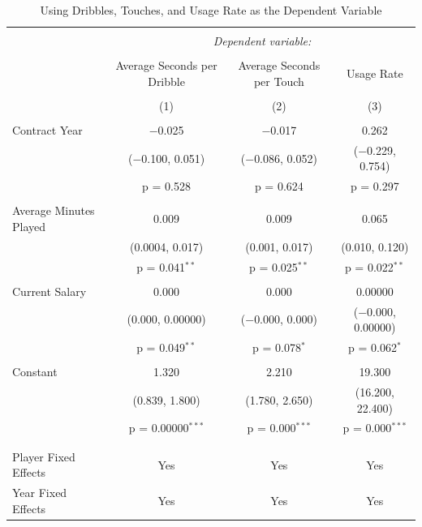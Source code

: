 \documentclass[12pt]{article}
\begin{document}
\begin{landscape}
		\begin{table}[!htbp] \centering 
			\caption{Using Dribbles, Touches, and Usage Rate as the Dependent Variable} 
			\label{} 
			\begin{tabular}{@{\extracolsep{5pt}}lccc} 
				\\[-1.8ex]\hline 
				\hline \\[-1.8ex] 
				& \multicolumn{3}{c}{\textit{Dependent variable:}} \\ 
				\cline{2-4} 
				\\[-1.8ex] & Average Seconds per Dribble & Average Seconds per Touch & Usage Rate \\ 
				\\[-1.8ex] & (1) & (2) & (3)\\ 
				\hline \\[-1.8ex] 
				Contract Year & $-$0.025 & $-$0.017 & 0.262 \\ 
				& ($-$0.100, 0.051) & ($-$0.086, 0.052) & ($-$0.229, 0.754) \\ 
				& p = 0.528 & p = 0.624 & p = 0.297 \\ 
				& & & \\ 
				Average Minutes Played & 0.009 & 0.009 & 0.065 \\ 
				& (0.0004, 0.017) & (0.001, 0.017) & (0.010, 0.120) \\ 
				& p = 0.041$^{**}$ & p = 0.025$^{**}$ & p = 0.022$^{**}$ \\ 
				& & & \\ 
				Current Salary & 0.000 & 0.000 & 0.00000 \\ 
				& (0.000, 0.00000) & ($-$0.000, 0.000) & ($-$0.000, 0.00000) \\ 
				& p = 0.049$^{**}$ & p = 0.078$^{*}$ & p = 0.062$^{*}$ \\ 
				& & & \\ 
				Constant & 1.320 & 2.210 & 19.300 \\ 
				& (0.839, 1.800) & (1.780, 2.650) & (16.200, 22.400) \\ 
				& p = 0.00000$^{***}$ & p = 0.000$^{***}$ & p = 0.000$^{***}$ \\ 
				& & & \\ 
				\hline \\[-1.8ex] 
				Player Fixed Effects & Yes & Yes & Yes \\ 
				Year Fixed Effects & Yes & Yes & Yes \\ 

\end{tabular}
\end{table}
\end{landscape}
\end{document}
